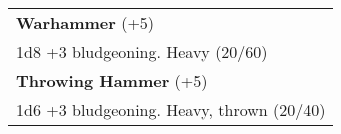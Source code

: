 \documentclass[twocolumn]{article}
\begin{document}
%

\vspace{40pt}

\\
\noindent\begin{tabular}{|m{3.1in}|}
\hline
\textbf{Warhammer} (+5) \\
1d8 +3 bludgeoning. Heavy (20/60)\\
\textbf{Throwing Hammer} (+5) \\
1d6 +3 bludgeoning. Heavy, thrown (20/40)\\

\hline
\end{tabular}
\vspace{8pt}
\end{document}

